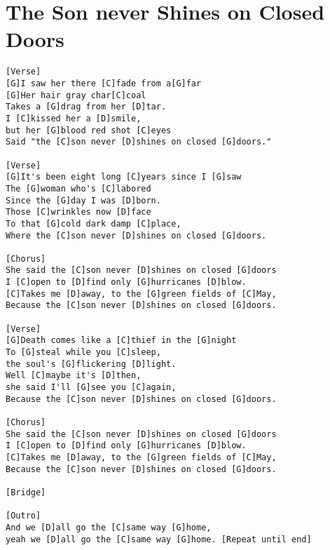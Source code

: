 \documentclass[leqno]{memoir}
\begin{document}
\chapter{The Son never Shines on Closed Doors}
\begin{verbatim}
[Verse]
[G]I saw her there [C]fade from a[G]far
[G]Her hair gray char[C]coal
Takes a [G]drag from her [D]tar.
I [C]kissed her a [D]smile,
but her [G]blood red shot [C]eyes
Said "the [C]son never [D]shines on closed [G]doors."

[Verse]
[G]It's been eight long [C]years since I [G]saw
The [G]woman who's [C]labored
Since the [G]day I was [D]born.
Those [C]wrinkles now [D]face
To that [G]cold dark damp [C]place,
Where the [C]son never [D]shines on closed [G]doors.

[Chorus]
She said the [C]son never [D]shines on closed [G]doors
I [C]open to [D]find only [G]hurricanes [D]blow.
[C]Takes me [D]away, to the [G]green fields of [C]May,
Because the [C]son never [D]shines on closed [G]doors.

[Verse]
[G]Death comes like a [C]thief in the [G]night
To [G]steal while you [C]sleep,
the soul's [G]flickering [D]light.
Well [C]maybe it's [D]then,
she said I'll [G]see you [C]again,
Because the [C]son never [D]shines on closed [G]doors.

[Chorus]
She said the [C]son never [D]shines on closed [G]doors
I [C]open to [D]find only [G]hurricanes [D]blow.
[C]Takes me [D]away, to the [G]green fields of [C]May,
Because the [C]son never [D]shines on closed [G]doors.

[Bridge]

[Outro]
And we [D]all go the [C]same way [G]home,
yeah we [D]all go the [C]same way [G]home. [Repeat until end]
\end{verbatim}
\newpage
\end{document}
